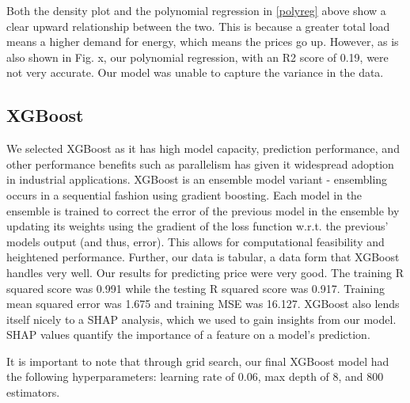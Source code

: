 \documentclass[10pt]{article}
\begin{document}
Both the density plot and the polynomial regression in \ref{polyreg} above show a clear upward relationship between the two. This is because a greater total load means a higher demand for energy, which means the prices go up. However, as is also shown in Fig. x, our polynomial regression, with an R2 score of 0.19, were not very accurate. Our model was unable to capture the variance in the data.  

\subsection{XGBoost}

We selected XGBoost as it has high model capacity, prediction performance, and other performance benefits such as parallelism has given it widespread adoption in industrial applications. XGBoost is an ensemble model variant - ensembling occurs in a sequential fashion using gradient boosting. Each model in the ensemble is trained to correct the error of the previous model in the ensemble by updating its weights using the gradient of the loss function w.r.t. the previous’ models output (and thus, error). This allows for computational feasibility and heightened performance. Further, our data is tabular, a data form that XGBoost handles very well. Our results for predicting price were very good. The training R squared score was 0.991 while the testing R squared score was 0.917. Training mean squared error was 1.675 and training MSE was 16.127. XGBoost also lends itself nicely to a SHAP analysis, which we used to gain insights from our model.  SHAP values quantify the importance of a feature on a model’s prediction.

It is important to note that through grid search, our final XGBoost model had the following hyperparameters: learning rate of 0.06, max depth of 8, and 800 estimators.
\end{document}
